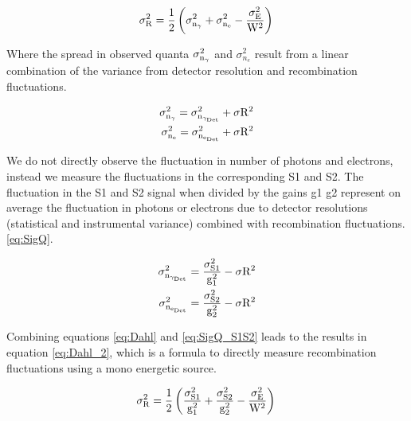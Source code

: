\begin{equation}
\rm \sigma_{R}^2  = \frac{1}{2}\left(\sigma_{n_\gamma}^2 + \sigma_{n_e}^2 - \frac{\sigma_E^2}{W^2}\right)\\
\label{eq:Dahl}
\end{equation}

Where the spread in observed quanta $\rm \sigma_{n_\gamma}^2$ and $\sigma_{n_e}^2$ result from a linear combination of the variance from detector resolution and recombination fluctuations.

\begin{equation}
\begin{split}
\rm  \sigma_{n_{\gamma}}^2 = \sigma_{n_{\gamma_{Det}}}^2 + \sigma{R^2}\\
\rm \sigma_{n_{e}}^2 = \sigma_{n_{e_{Det}}}^2 + \sigma{R^2}
\label{eq:SigQ}
\end{split}
\end{equation}

We do not directly observe the fluctuation in number of photons and electrons, instead we measure the fluctuations in the corresponding S1 and S2. The fluctuation in the S1 and S2 signal when divided by the gains g1 g2 represent on average the fluctuation in photons or electrons due to detector resolutions (statistical and instrumental variance) combined with recombination fluctuations. \ref{eq:SigQ}.


\begin{equation}
\begin{split}
\rm  \sigma_{n_{\gamma_{Det}}}^2 = \frac{\sigma_{S1}^2}{g_1^2} - \sigma{R^2}\\
\rm \sigma_{n_{e_{Det}}}^2 = \frac{\sigma_{S2}^2}{g_2^2} - \sigma{R^2}
\label{eq:SigQ_S1S2}
\end{split}
\end{equation}

Combining equations \ref{eq:Dahl} and \ref{eq:SigQ_S1S2} leads to the results in equation \ref{eq:Dahl_2}, which is a formula to directly measure recombination fluctuations using a mono energetic source.

\begin{equation}
\rm \sigma_{R}^2  = \frac{1}{2}\left( \frac{\sigma_{S1}^2}{g_1^2} + \frac{\sigma_{S2}^2}{g_2^2} - \frac{\sigma_E^2}{W^2}\right)\\
\label{eq:Dahl_2}
\end{equation}

